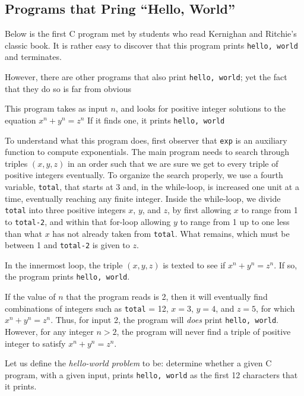 \documentclass[]{article}
\begin{document}
\subsection*{Programs that Pring ``Hello, World''}
Below is the first C program met by students who read Kernighan and
Ritchie's classic book. It is rather easy to discover that this program
prints \texttt{hello, world} and terminates.



However, there are other programs that also print \texttt{hello, world};
yet the fact that they do so is far from obvious



This program takes as input $n$, and looks for positive integer solutions
to the equation $x^n + y^n = z^n$ If it finds one, it prints
\texttt{hello, world}

To understand what this program does, first observer that \texttt{exp} is
an auxiliary function to compute exponentials. The main program needs to
search through triples $(x,y,z)$ in an order such that we are sure we get
to every triple of positive integers eventually. To organize the search
properly, we use a fourth variable, \texttt{total}, that starts at 3 and,
in the while-loop, is increased one unit at a time, eventually reaching any
finite integer. Inside the while-loop, we divide \texttt{total} into three
positive integers $x$, $y$, and $z$, by first allowing $x$ to range from 1
to \texttt{total-2}, and within that for-loop allowing $y$ to range from 1
up to one less than what $x$ has not already taken from \texttt{total}.
What remains, which must be between 1 and \texttt{total-2} is given to $z$.

In the innermost loop, the triple $(x,y,z)$ is texted to see if
$x^n + y^n = z^n$. If so, the program prints \texttt{hello, world}.

If the value of $n$ that the program reads is 2, then it will eventually
find combinations of integers such as \texttt{total} = 12,
$x = 3$, $y = 4$,
and $z = 5$, for which $x^n + y^n = z^n$. Thus, for input 2, the program
will \emph{does} print \texttt{hello, world}. However, for any integer
$n > 2$, the program will never find a triple of positive integer to
satisfy $x^n + y^n = z^n$.

Let us define the \emph{hello-world problem} to be: determine whether a
given C program, with a given input, prints \texttt{hello, world} as the
first 12 characters that it prints.
\end{document}
